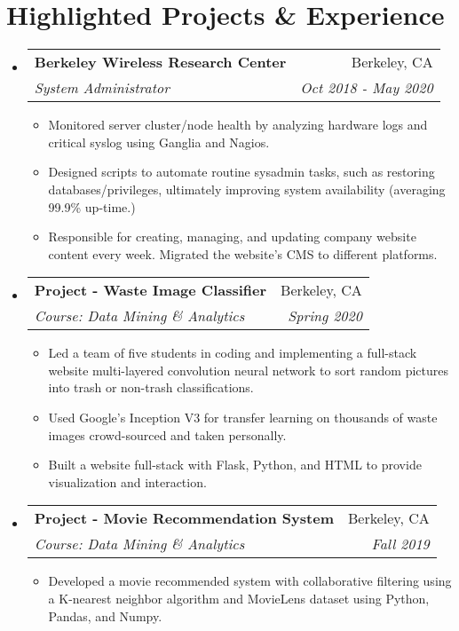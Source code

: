 \documentclass[letterpaper,11pt]{article}
\makeatletter
\newcommand{\resumeSubheading}[4]{
  \vspace{-1pt}\item
    \begin{tabular*}{0.97\textwidth}{l@{\extracolsep{\fill}}r}
      \textbf{#1} & #2 \\
      \textit{\small#3} & \textit{\small #4} \\
    \end{tabular*}\vspace{-5pt}
}
\newcommand{\resumeSubHeadingListStart}{\begin{itemize}[leftmargin=*]}
\newcommand{\resumeSubHeadingListEnd}{\end{itemize}}
\makeatother
\begin{document}
\section{Highlighted Projects \& Experience}
  \resumeSubHeadingListStart
    \resumeSubheading
      {Berkeley Wireless Research Center}{Berkeley, CA}
      {System Administrator}{Oct 2018 - May 2020}
      \begin{itemize}
        \item
          {Monitored server cluster/node health by analyzing hardware logs and critical syslog using Ganglia and Nagios.}
        \item
       	 {Designed scripts to automate routine sysadmin tasks, such as restoring databases/privileges, ultimately improving system availability (averaging 99.9\% up-time.)}
        \item
          {Responsible for creating, managing, and updating company website content every week. Migrated the website's CMS to different platforms.}
      \end{itemize}

    \resumeSubheading
		{Project - Waste Image Classifier}{Berkeley, CA}
		{Course: Data Mining \& Analytics}{Spring 2020}
		\begin{itemize}
			\item	{Led a team of five students in coding and implementing a full-stack website multi-layered convolution neural network to sort random pictures into trash or non-trash classifications.}
			\item	{Used Google's Inception V3 for transfer learning on thousands of waste images crowd-sourced and taken personally.}
			\item {Built a website full-stack with Flask, Python, and HTML to provide visualization and interaction.}
		\end{itemize}
	\resumeSubheading
	{Project - Movie Recommendation System}{Berkeley, CA}
	{Course: Data Mining \& Analytics}{Fall 2019}
	\begin{itemize}
		\item	{Developed a movie recommended system with collaborative filtering using a K-nearest neighbor algorithm and MovieLens dataset using Python, Pandas, and Numpy.}
	\end{itemize}
  \resumeSubHeadingListEnd


\end{document}
